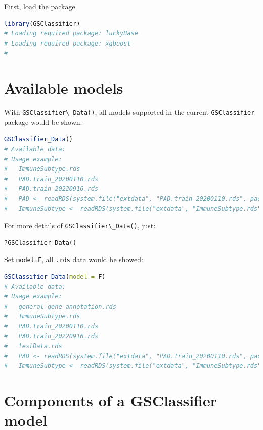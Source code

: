 \documentclass[
  12pt,
]{book}
\newcommand{\passthrough}[1]{#1}
\begin{document}
First, load the package

\begin{lstlisting}[language=R]
library(GSClassifier)
# Loading required package: luckyBase
# Loading required package: xgboost
# 
\end{lstlisting}

\hypertarget{available-models}{%
\section{Available models}\label{available-models}}

With \passthrough{\lstinline!GSClassifier\_Data()!}, all models supported in the current \passthrough{\lstinline!GSClassifier!} package would be shown.

\begin{lstlisting}[language=R]
GSClassifier_Data()
# Available data:
# Usage example:
#   ImmuneSubtype.rds 
#   PAD.train_20200110.rds 
#   PAD.train_20220916.rds 
#   PAD <- readRDS(system.file("extdata", "PAD.train_20200110.rds", package = "GSClassifier")) 
#   ImmuneSubtype <- readRDS(system.file("extdata", "ImmuneSubtype.rds", package = "GSClassifier"))
\end{lstlisting}

For more details of \passthrough{\lstinline!GSClassifier\_Data()!}, just:

\begin{lstlisting}
?GSClassifier_Data()
\end{lstlisting}

Set \passthrough{\lstinline!model=F!}, all \passthrough{\lstinline!.rds!} data would be showed:

\begin{lstlisting}[language=R]
GSClassifier_Data(model = F)
# Available data:
# Usage example:
#   general-gene-annotation.rds 
#   ImmuneSubtype.rds 
#   PAD.train_20200110.rds 
#   PAD.train_20220916.rds 
#   testData.rds 
#   PAD <- readRDS(system.file("extdata", "PAD.train_20200110.rds", package = "GSClassifier")) 
#   ImmuneSubtype <- readRDS(system.file("extdata", "ImmuneSubtype.rds", package = "GSClassifier"))
\end{lstlisting}

\hypertarget{components-of-a-gsclassifier-model}{%
\section{Components of a GSClassifier model}\label{components-of-a-gsclassifier-model}}
\end{document}
